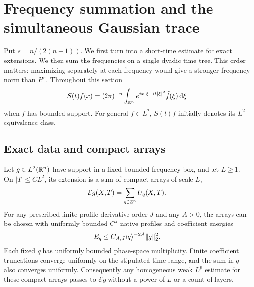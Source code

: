 \section{Frequency summation and the simultaneous Gaussian trace}
\label{e:section}

Put $s=n/(2(n+1))$.  We first turn  into a
short-time estimate for exact extensions.  We then sum the frequencies on a
single dyadic time tree.  This order matters: maximizing separately at each
frequency would give a stronger frequency norm than $H^s$.
Throughout this section
\[
 S(t)f(x)=(2\pi)^{-n}\int_{\mathbb R^n}
       e^{ix\cdot\xi-it|\xi|^2}\widehat f(\xi)\,\mathrm d\xi
\]
when $\widehat f$ has bounded support.  For general $f\in L^2$, $S(t)f$
initially denotes its $L^2$ equivalence class.

\subsection{Exact data and compact arrays}

\begin{lemma}
\label{e:compact-layers}
Let $g\in L^2(\mathbb R^n)$ have support in a fixed bounded frequency box, and let
$L\ge1$.  On $|T|\le C L^2$, its extension is a sum of compact arrays of
scale $L$,
\[
 \mathcal E g(X,T)=\sum_{q\in\mathbb Z^n} U_q(X,T).
\]
For any prescribed finite profile derivative order $J$ and any $A>0$, the
arrays can be chosen with uniformly bounded $C^J$ native profiles and
coefficient energies
\begin{equation}
 E_q\le C_{A,J}\langle q\rangle^{-2A}\lVert g\rVert_2^2.
 \label{e:layer-energy}
\end{equation}
Each fixed $q$ has uniformly bounded phase-space multiplicity.  Finite
coefficient truncations converge uniformly on the stipulated time range,
and the sum in $q$ also converges uniformly.  Consequently any homogeneous
weak $L^p$ estimate for these compact arrays passes to $\mathcal E g$
without a power of $L$ or a count of layers.
\end{lemma}

